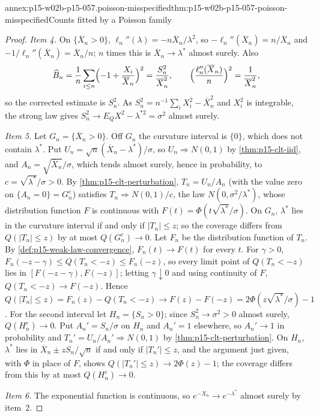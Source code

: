\begin{annexitem}{annex:p15-w02b-p15-057.poisson-misspecified}{thm:p15-w02b-p15-057-poisson-misspecified}{Counts fitted by a Poisson family}
\begin{proof}
\emph{Item 4.} On \(\{\overline X_n>0\}\),
\(\ell_n''(\lambda)=-n\overline X_n/\lambda^2\), so
\(-\ell_n''(\overline X_n)=n/\overline X_n\) and
\(-1/\ell_n''(\overline X_n)=\overline X_n/n\); \(n\) times this is
\(\overline X_n\to\lambda^*\) almost surely. Also
\[
 \widehat B_n=\frac1n\sum_{i\leq n}\Bigl(-1+\frac{X_i}{\overline X_n}\Bigr)^2
 =\frac{S_n^2}{\overline X_n^2},\qquad
 \Bigl(\frac{\ell_n''(\overline X_n)}n\Bigr)^2=\frac1{\overline X_n^2},
\]
so the corrected estimate is \(S_n^2\). As
\(S_n^2=n^{-1}\sum_iX_i^2-\overline X_n^2\) and \(X_i^2\) is integrable,
the strong law gives \(S_n^2\to E_QX^2-\lambda^{*2}=\sigma^2\) almost
surely.

\emph{Item 5.} Let \(G_n=\{\overline X_n>0\}\). Off \(G_n\) the curvature
interval is \(\{0\}\), which does not contain \(\lambda^*\). Put
\(U_n=\sqrt n(\overline X_n-\lambda^*)/\sigma\), so
\(U_n\Rightarrow N(0,1)\) by \cref{thm:p15-clt-iid}, and
\(A_n=\sqrt{\overline X_n}/\sigma\), which tends almost surely, hence in
probability, to \(c=\sqrt{\lambda^*}/\sigma>0\). By
\cref{thm:p15-clt-perturbation}, \(T_n=U_n/A_n\) (with the value zero on
\(\{A_n=0\}=G_n^c\)) satisfies \(T_n\Rightarrow N(0,1)/c\), the law
\(N(0,\sigma^2/\lambda^*)\), whose distribution function \(F\) is
continuous with \(F(t)=\Phi(t\sqrt{\lambda^*}/\sigma)\). On \(G_n\),
\(\lambda^*\) lies in the curvature interval if and only if
\(|T_n|\leq z\); so the coverage differs from \(Q(|T_n|\leq z)\) by at
most \(Q(G_n^c)\to0\). Let \(F_n\) be the distribution function of
\(T_n\). By \cref{def:p15-weak-law-convergence}, \(F_n(t)\to F(t)\) for
every \(t\). For \(\gamma>0\),
\(F_n(-z-\gamma)\leq Q(T_n<-z)\leq F_n(-z)\), so every limit point of
\(Q(T_n<-z)\) lies in \([F(-z-\gamma),F(-z)]\); letting
\(\gamma\downarrow0\) and using continuity of \(F\),
\(Q(T_n<-z)\to F(-z)\). Hence
\(Q(|T_n|\leq z)=F_n(z)-Q(T_n<-z)\to F(z)-F(-z)
=2\Phi(z\sqrt{\lambda^*}/\sigma)-1\). For the second interval let
\(H_n=\{S_n>0\}\); since \(S_n^2\to\sigma^2>0\) almost surely,
\(Q(H_n^c)\to0\). Put \(A_n'=S_n/\sigma\) on \(H_n\) and \(A_n'=1\)
elsewhere, so \(A_n'\to1\) in probability and \(T_n'=U_n/A_n'\Rightarrow
N(0,1)\) by \cref{thm:p15-clt-perturbation}. On \(H_n\), \(\lambda^*\)
lies in \(\overline X_n\pm zS_n/\sqrt n\) if and only if \(|T_n'|\leq z\),
and the argument just given, with \(\Phi\) in place of \(F\), shows
\(Q(|T_n'|\leq z)\to2\Phi(z)-1\); the coverage differs from this by at
most \(Q(H_n^c)\to0\).

\emph{Item 6.} The exponential function is continuous, so
\(e^{-\overline X_n}\to e^{-\lambda^*}\) almost surely by item~2.


\end{proof}
\end{annexitem}
